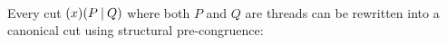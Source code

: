 \begin{code}[hide]
\AgdaSymbol{)\}}\AgdaSpace{}%
\AgdaSymbol{\{}\AgdaSpace{}%
\AgdaSymbol{:}\AgdaSpace{}%
\AgdaSpace{}%
\AgdaSymbol{(}\AgdaSpace{}%
\AgdaSpace{}%
\AgdaSymbol{)\}}\AgdaSpace{}%
\AgdaSpace{}%
\AgdaSpace{}%
\AgdaSpace{}%
\AgdaSpace{}%
\AgdaSpace{}%
\AgdaSpace{}%
\AgdaSymbol{(}\AgdaSpace{}%
\AgdaSpace{}%
\AgdaSpace{}%
\AgdaSpace{}%
\AgdaSymbol{)}\<%
\\
\>[0]\AgdaSpace{}%
\AgdaSymbol{()}\AgdaSpace{}%
\AgdaSymbol{(}\AgdaSpace{}%
\AgdaSpace{}%
\AgdaSpace{}%
\AgdaOperator{\AgdaInductiveConstructor{,}}\AgdaSpace{}%
\AgdaSpace{}%
\AgdaSpace{}%
\AgdaSymbol{)}\<%
\end{code}

Every cut $(x)(P\mathbin| Q)$ where both $P$ and $Q$ are threads can be rewritten
into a canonical cut using structural pre-congruence:

